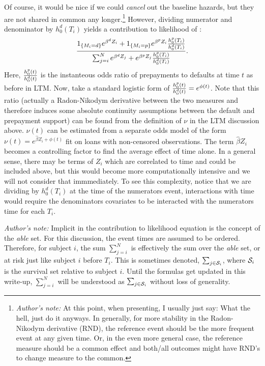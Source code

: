 \documentclass[10pt]{article}
\begin{document}
Of course, it would be nice if we could {\em cancel} out the baseline hazards, but they are not shared in common any longer.\footnote{{\em
Author's note:}  At this point, when presenting, I usually just say: What the hell, just do it anyways.  In generally, for more stability 
in the Radon-Nikodym derivative (RND), the reference event should be the more frequent event at any given time.  Or, in the even more general
case, the reference measure should be a common effect and both/all outcomes might have RND's to change measure to the common.}
However, dividing numerator and 
denominator by $h^d_0(T_i)$ yields a contribution to likelihood of :
$$ {{1_{\{M_i=d\}}e^{\beta^d Z_i}+1_{\{M_i=p\}}e^{\beta^p Z_i}{h^p_0(T_i)\over h^d_0(T_i)} } 
\over { \sum_{j=i}^N e^{\beta^d Z_j}+e^{\beta^p Z_j}{h^p_0(T_i)\over h^d_0(T_i)} } }.$$
Here, ${h^p_0(t)\over h^d_0(t)}$ is the instanteous odds ratio of prepayments to defaults at time $t$ as before in LTM.  Now, take a standard logistic form of 
${h^p_0(t)\over h^d_0(t)}={e^{\phi(t)}}$. Note that this ratio (actually a Radon-Nikodym derivative between the two measures and therefore induces some 
absolute continuity assumptions between the default and prepayment support) can be found from the definition of $\nu$ in the LTM discussion above.  
$\nu(t)$ can be estimated from a separate odds model of the form $\nu(t)=e^{\hat{\beta}Z_i+\phi(t)}$ fit on loans with non-censored observations.  The 
term ${\hat{\beta}Z_i}$ becomes a controlling factor to find the average effect of time alone.  In a general sense, there may be terms of $Z_i$ which are 
correlated to time and could be included above, but this would become more computationally intensive and we will not consider that immmediately. To see this 
complexity, notice that we are dividing by $h^d_0(T_i)$ at the time of the numerators event, interactions with time would require the denominators covariates
to be interacted with the numerators time for each $T_i$.  

{\em Author's note:}
Implicit in the contribution to likelihood equation is the concept of the {\em able} set.  For this discussion, the event times
are assumed to be ordered. Therefore, for subject $i$, the sum
$\sum_{j=i}^N$ is effectively the sum over the {\em able} set, or at risk just like subject $i$ before $T_i$.  
This is sometimes denoted, $\sum_{j \in {\cal S}_i}$, where ${\cal S}_i$ is the survival set relative to subject $i$.
Until the formulas get updated in this write-up, $\sum_{j=i}^N$ will be understood as $\sum_{j \in {\cal S}_i}$ without loss of generality.
\end{document}
